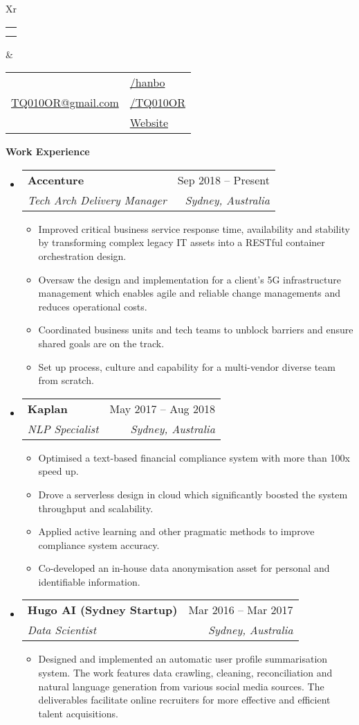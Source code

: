\documentclass[letterpaper,12pt]{article}[leftmargin=*]
\makeatletter
\def \fullname {Bo HAN}
\def \subtitle {}
\def \linkedinicon {\faLinkedin}
\def \linkedinlink {https://linkedin.com/in/hanbo/}
\def \linkedintext {/hanbo}
\def \phoneicon {\faPhone}
\def \phonetext {+61-425-719-696}
\def \emailicon {\faEnvelope}
\def \emaillink {mailto:tq010or@gmail.com}
\def \emailtext {TQ010OR@gmail.com}
\def \githubicon {\faGithub}
\def \githublink {https://github.com/tq010or}
\def \githubtext {/TQ010OR}
\def \websiteicon {\faGlobe}
\def \websitelink {http://tq010or.github.io/}
\def \websitetext {Website}
\def \headertype {\doublecol} %
\def \entryspacing {-0pt}
\def \linkedin {\linkedinicon \hspace{3pt}\href{\linkedinlink}{\linkedintext}}
\def \phone {\phoneicon \hspace{3pt}{ \phonetext}}
\def \email {\emailicon \hspace{3pt}\href{\emaillink}{\emailtext}}
\def \github {\githubicon \hspace{3pt}\href{\githublink}{\githubtext}}
\def \website {\websiteicon \hspace{3pt}\href{\websitelink}{\websitetext}}
\renewcommand{\section}[2]{\vspace{5pt}
  \colorbox{secondary}{\color{white}\raggedbottom\normalsize\textbf{{#1}{\hspace{7pt}#2}}}
}
\newcommand{\resumeEntryStart}{\begin{itemize}[leftmargin=2.5mm]}
\newcommand{\resumeEntryEnd}{\end{itemize}\vspace{\entryspacing}}
\newcommand{\resumeItemListStart}{\begin{itemize}[leftmargin=4.5mm]}
\newcommand{\resumeItemListEnd}{\end{itemize}}
\newcommand{\resumeItem}[1]{
  \item\small{
    {#1 \vspace{-2pt}}
  }
}
\newcommand{\resumeEntryTSDL}[4]{
  \vspace{-1pt}\item[]
    \begin{tabularx}{0.97\textwidth}{X@{\hspace{60pt}}r}
      \textbf{\color{primary}#1} & {\firabook\color{accent}\small#2} \\
      \textit{\color{accent}\small#3} & \textit{\color{accent}\small#4} \\
    \end{tabularx}\vspace{-6pt}
}
\newcommand{\doublecol}[6]{
  \begin{tabularx}{\textwidth}{Xr}
    {
      \begin{tabular}[c]{l}
        \fontsize{35}{45}\selectfont{\color{primary}{{\textbf{\fullname}}}} \\
        {\textit{\subtitle}} %
      \end{tabular}
    } & {
      \begin{tabular}[c]{l@{\hspace{1.5em}}l}
        {\small#4} & {\small#1} \\
        {\small#5} & {\small#2} \\
        {\small#6} & {\small#3}
      \end{tabular}
    }
  \end{tabularx}
}
\newcommand{\singlecol}[6]{
  \begin{tabularx}{\textwidth}{Xr}
    {
      \begin{tabular}[b]{l}
        \fontsize{35}{45}\selectfont{\color{primary}{{\textbf{\fullname}}}} \\
        {\textit{\subtitle}} %
      \end{tabular}
    } & {
      \begin{tabular}[c]{l}
        {\small#1} \\
        {\small#2} \\
        {\small#3} \\
        {\small#4} \\
        {\small#5} \\
        {\small#6}
      \end{tabular}
    }
  \end{tabularx}
}
\makeatother
\begin{document}


\headertype{\linkedin}{\github}{\website}{\phone}{\email}{} %
\vspace{-10pt} %


\section{\faPieChart}{Work Experience}
  \resumeEntryStart
    \resumeEntryTSDL
      {Accenture}{Sep 2018 -- Present}
      {Tech Arch Delivery Manager}{Sydney, Australia}
    \resumeItemListStart
      \resumeItem {Improved critical business service response time, availability and stability by transforming complex legacy IT assets into a RESTful container orchestration design.}
      \resumeItem {Oversaw the design and implementation for a client's 5G infrastructure management which enables agile and reliable change managements and reduces operational costs.}
      \resumeItem {Coordinated business units and tech teams to unblock barriers and ensure shared goals are on the track.}
      \resumeItem {Set up process, culture and capability for a multi-vendor diverse team from scratch.}
    \resumeItemListEnd
  \resumeEntryEnd

  \resumeEntryStart
    \resumeEntryTSDL
      {Kaplan}{May 2017 -- Aug 2018}
      {NLP Specialist}{Sydney, Australia}
    \resumeItemListStart
      \resumeItem {Optimised a text-based financial compliance system with more than 100x speed up.} 
      \resumeItem{Drove a serverless design in cloud which significantly boosted the system throughput and scalability.}
      \resumeItem {Applied active learning and other pragmatic methods to improve compliance system accuracy.}
      \resumeItem {Co-developed an in-house data anonymisation asset for personal and identifiable information.}
    \resumeItemListEnd
  \resumeEntryEnd

  \resumeEntryStart
    \resumeEntryTSDL
      {Hugo AI (Sydney Startup)}{Mar 2016 -- Mar 2017}
      {Data Scientist}{Sydney, Australia}
    \resumeItemListStart
        \resumeItem {Designed and implemented an automatic user profile summarisation system. The work features data crawling, cleaning, reconciliation and natural language generation from various social media sources. The deliverables facilitate online recruiters for more effective and efficient talent acquisitions.}
    \resumeItemListEnd
  \resumeEntryEnd
\end{document}

